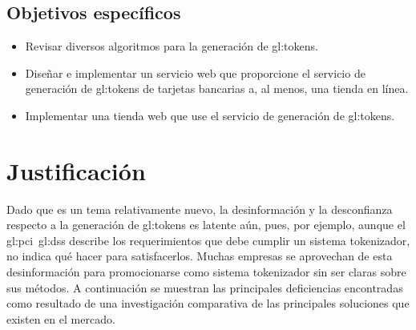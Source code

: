 \subsection{Objetivos específicos}

\begin{itemize}
  \item Revisar diversos algoritmos para la generación de \glspl{gl:token}.
  \item Diseñar e implementar un servicio web que proporcione el servicio de
    generación de \glspl{gl:token} de tarjetas bancarias a, al menos, una tienda
    en línea.
  \item Implementar una tienda web que use el servicio de generación de
    \glspl{gl:token}.
\end{itemize}

\section{Justificación}

Dado que es un tema relativamente nuevo, la desinformación y la desconfianza
respecto a la generación de \glspl{gl:token} es latente aún, pues, por ejemplo,
aunque el \gls{gl:pci}~\gls{gl:dss} describe los requerimientos que debe cumplir
un sistema tokenizador, no indica qué hacer para satisfacerlos. Muchas empresas
se aprovechan de esta desinformación para promocionarse como sistema
tokenizador sin ser claras sobre sus métodos. A continuación se muestran las
principales deficiencias encontradas como resultado de una investigación
comparativa de las principales soluciones que existen en el mercado.

